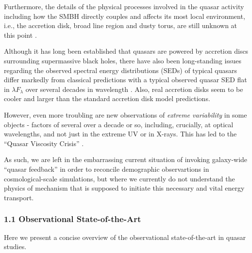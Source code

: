 \smallskip 
\smallskip
\noindent
Furthermore, the details of the physical processes involved in the
quasar activity including how the SMBH directly couples and affects
its most local environment, i.e., the accretion disk, broad line
region and dusty torus, are still unknown at this point
\citep[e.g.,][]{Netzer2015, Padovani2017}.

\smallskip 
\smallskip
\noindent
Although it has long been established that quasars are powered by
accretion discs surrounding supermassive black holes, there have also
been long-standing issues regarding the observed spectral energy
distributions (SEDs) of typical quasars
\citep[e.g.,][]{Koratkar_Blaes1999, Sirko_Goodman2003} differ markedly
from classical predictions \citep[][]{SS73, Pringle1981} with a
typical observed quasar SED flat in $\lambda F_{\lambda}$ over several
decades in wavelength \citep{Elvis1994, Richards2006b}.  Also, real
accretion disks seem to be cooler \cite[e.g., ][]{Lawrence2012} and
larger \cite[e.g.,][]{Pooley2007, Morgan2010, Morgan2012,
Mosquera2011} than the standard accretion disk model predictions.

\smallskip 
\smallskip
\noindent
However, even more troubling are new observations of {\it extreme variability} in some objects - 
factors of several over a decade or so, including, crucially, at optical wavelengths, 
and not just in the extreme UV or in X-rays. This has led to the ``Quasar Viscosity Crisis''
\citep{Lawrence2018}. 


\smallskip 
\smallskip
\noindent
As such, we are left in the embarrassing current situation of invoking
galaxy-wide ``quasar feedback'' in order to reconcile demographic
observartions in cosmological-scale simulations, but where we
currently do not understand the physics of mechanism that is supposed
to initiate this necessary and vital energy transport.



\subsubsection*{1.1 Observational State-of-the-Art}
Here we present a concise overview of the observational state-of-the-art 
in quasar studies. 

